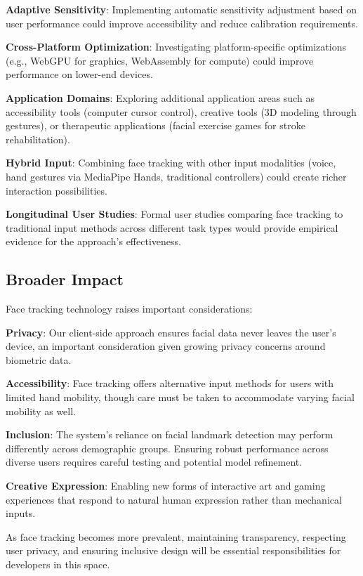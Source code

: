 \documentclass[sigconf]{acmart}
\begin{document}
\textbf{Adaptive Sensitivity}: Implementing automatic sensitivity adjustment based on user performance could improve accessibility and reduce calibration requirements.

\textbf{Cross-Platform Optimization}: Investigating platform-specific optimizations (e.g., WebGPU for graphics, WebAssembly for compute) could improve performance on lower-end devices.

\textbf{Application Domains}: Exploring additional application areas such as accessibility tools (computer cursor control), creative tools (3D modeling through gestures), or therapeutic applications (facial exercise games for stroke rehabilitation).

\textbf{Hybrid Input}: Combining face tracking with other input modalities (voice, hand gestures via MediaPipe Hands, traditional controllers) could create richer interaction possibilities.

\textbf{Longitudinal User Studies}: Formal user studies comparing face tracking to traditional input methods across different task types would provide empirical evidence for the approach's effectiveness.

\subsection{Broader Impact}

Face tracking technology raises important considerations:

\textbf{Privacy}: Our client-side approach ensures facial data never leaves the user's device, an important consideration given growing privacy concerns around biometric data.

\textbf{Accessibility}: Face tracking offers alternative input methods for users with limited hand mobility, though care must be taken to accommodate varying facial mobility as well.

\textbf{Inclusion}: The system's reliance on facial landmark detection may perform differently across demographic groups. Ensuring robust performance across diverse users requires careful testing and potential model refinement.

\textbf{Creative Expression}: Enabling new forms of interactive art and gaming experiences that respond to natural human expression rather than mechanical inputs.

As face tracking becomes more prevalent, maintaining transparency, respecting user privacy, and ensuring inclusive design will be essential responsibilities for developers in this space.
\end{document}
